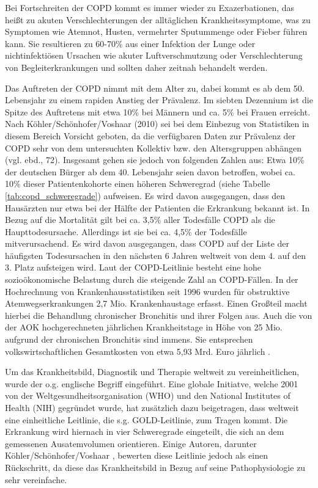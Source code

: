 Bei Fortschreiten der COPD kommt es immer wieder zu Exazerbationen, das heißt zu akuten Verschlechterungen der alltäglichen Krankheitssymptome, was zu Symptomen wie Atemnot, Husten, vermehrter Sputummenge oder Fieber führen kann. Sie resultieren zu 60-70\% aus einer Infektion der Lunge oder nichtinfektiösen Ursachen wie akuter Luftverschmutzung oder Verschlechterung von Begleiterkrankungen und sollten daher zeitnah behandelt werden.

Das Auftreten der COPD nimmt mit dem Alter zu, dabei kommt es ab dem 50. Lebensjahr zu einem rapiden Anstieg der Prävalenz. Im siebten Dezennium ist die Spitze des Auftretens mit etwa 10\% bei Männern und ca. 5\% bei Frauen erreicht\autocite[vgl.][153]{lorenz2009}. Nach Köhler/Schönhofer/Voshaar (2010) sei bei dem Einbezug von Statistiken in diesem Bereich Vorsicht geboten, da die verfügbaren Daten zur Prävalenz der COPD sehr von dem untersuchten Kollektiv bzw. den Altersgruppen abhängen (vgl. ebd., 72). Insgesamt gehen sie jedoch von folgenden Zahlen aus: Etwa 10\% der deutschen Bürger ab dem 40. Lebensjahr seien davon betroffen, wobei ca. 10\% dieser Patientenkohorte einen höheren Schweregrad (siehe Tabelle \ref{tab:copd_schweregrade})  aufweisen. Es wird davon ausgegangen, dass den Hausärzten nur etwa bei der Hälfte der Patienten die Erkrankung bekannt ist.
In Bezug auf die Mortalität gilt bei ca. 3,5\% aller Todesfälle COPD als die Haupttodesursache. Allerdings ist sie bei ca. 4,5\% der Todesfälle mitverursachend. Es wird davon ausgegangen, dass COPD auf der Liste der häufigsten Todesursachen in den nächsten 6 Jahren weltweit von dem 4. auf den 3. Platz aufsteigen wird.
Laut der COPD-Leitlinie besteht eine hohe sozioökonomische Belastung durch die steigende Zahl an COPD-Fällen. In der Hochrechnung von Krankenhausstatistiken seit 1996 wurden für obstruktive Atemwegserkrankungen 2,7 Mio. Krankenhaustage erfasst. Einen Großteil macht hierbei die Behandlung chronischer Bronchitis und ihrer Folgen aus. Auch die von der AOK hochgerechneten jährlichen Krankheitstage in Höhe von 25 Mio. aufgrund der chronischen Bronchitis sind immens. Sie entsprechen volkswirtschaftlichen Gesamtkosten von etwa 5,93 Mrd. Euro jährlich \autocite[vgl.][e4]{vogelmeier2007}.

Um das Krankheitsbild, Diagnostik und Therapie weltweit zu vereinheitlichen, wurde der o.g. englische Begriff eingeführt. Eine globale Initiatve, welche 2001 von der Weltgesundheitsorganisation (WHO) und den National Institutes of Health (NIH) gegründet wurde, hat zusätzlich dazu beigetragen, dass weltweit eine einheitliche Leitlinie, die s.g. GOLD-Leitlinie, zum Tragen kommt. Die Erkrankung wird hiernach in vier Schweregrade eingeteilt, die sich an dem gemessenen Ausatemvolumen orientieren. Einige Autoren, darunter Köhler/Schönhofer/Voshaar \autocite[vgl.][75]{koehler2010}, bewerten diese Leitlinie jedoch als einen Rückschritt, da diese das Krankheitsbild in Bezug auf seine Pathophysiologie zu sehr vereinfache.

